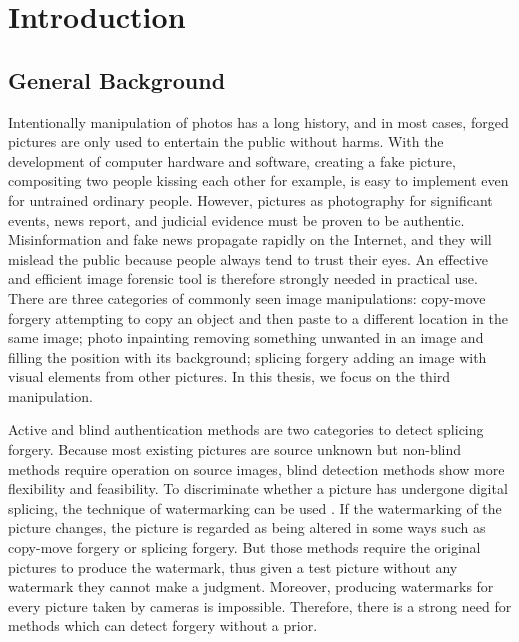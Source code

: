 \documentclass[a4paper, 12pt, twoside]{report}
\begin{document}
\maketitle

\chapter{Introduction}
\section{General Background}
Intentionally manipulation of photos has a long history, and in most cases, forged pictures are only used to entertain the public without harms. With the development of computer hardware and software, creating a fake picture, compositing two people kissing each other for example, is easy to implement even for untrained ordinary people. However, pictures as photography for significant events, news report, and judicial evidence must be proven to be authentic. Misinformation and fake news propagate rapidly on the Internet, and they will mislead the public because people always tend to trust their eyes. An effective and efficient image forensic tool is therefore strongly needed in practical use. There are three categories of commonly seen image manipulations: copy-move forgery attempting to copy an object and then paste to a different location in the same image; photo inpainting removing something unwanted in an image and filling the position with its background; splicing forgery adding an image with visual elements from other pictures. In this thesis, we focus on the third manipulation. 

Active \cite{RN56, RN55} and blind authentication methods \cite{is1, is2} are two categories to detect splicing forgery. Because most existing pictures are source unknown but non-blind methods require operation on source images, blind detection methods show more flexibility and feasibility. To discriminate whether a picture has undergone digital splicing, the technique of watermarking can be used \cite{RN59}. If the watermarking of the picture changes, the picture is regarded as being altered in some ways such as copy-move forgery or splicing forgery. But those methods require the original pictures to produce the watermark, thus given a test picture without any watermark they cannot make a judgment. Moreover, producing watermarks for every picture taken by cameras is impossible. Therefore, there is a strong need for methods which can detect forgery without a prior.
\end{document}
